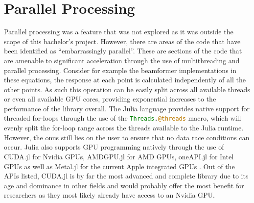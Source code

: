 \section{Parallel Processing}
Parallel processing was a feature that was not explored as it was outside the scope of this bachelor's project. However,
there are areas of the code that have been identified as ``embarrassingly parallel''. These are sections of the code
that are amenable to significant acceleration through the use of multithreading and parallel processing. Consider for
example the beamformer implementations in these equations, the response at each point is calculated independently of all
the other points. As such this operation can be easily split across all available threads or even all available GPU
cores, providing exponential increases to the performance of the library overall. The Julia language provides native
support for threaded for-loops through the use of the \lstinline[language=Julia]{Threads.@threads} macro, which will
evenly split the for-loop range across the threads available to the Julia runtime. However, the onus still lies on the
user to ensure that no data race conditions can occur. Julia also supports GPU programming natively through the use of
CUDA.jl for Nvidia GPUs, AMDGPU.jl for AMD GPUs, oneAPI.jl for Intel GPUs as well as Metal.jl for the current Apple
integrated GPUs \cite{JuliaGPU}. Out of the APIs listed, CUDA.jl is by far the most advanced and complete library due to
its age and dominance in other fields and would probably offer the most benefit for researchers as they most likely
already have access to an Nvidia GPU.